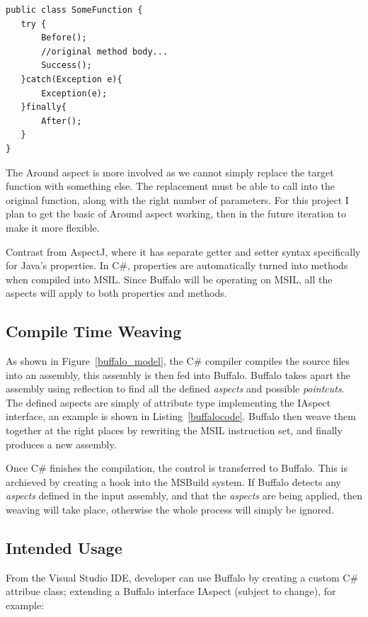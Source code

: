 \begin{lstlisting}[caption={Buffalo aspects}, label=boundaryaspect]
public class SomeFunction {
   try {
       Before();
       //original method body...
       Success();
   }catch(Exception e){
       Exception(e);
   }finally{
       After();
   }
}
\end{lstlisting}

The Around aspect is more involved as we cannot simply replace the target function with something else. The replacement must be able to call into the original function, along with the right number of parameters. For this project I plan to get the basic of Around aspect working, then in the future iteration to make it more flexible.

Contrast from AspectJ, where it has separate getter and setter syntax specifically for Java's properties. In C\#, properties are automatically turned into methods when compiled into MSIL. Since Buffalo will be operating on MSIL, all the aspects will apply to both properties and methods.

\subsection{Compile Time Weaving}
As shown in Figure~\ref{buffalo_model}, the C\# compiler compiles the source files into an assembly, this assembly is then fed into Buffalo. Buffalo takes apart the assembly using reflection to find all the defined {\em aspects} and possible {\em pointcuts}. The defined aspects are simply of attribute type implementing the IAspect interface, an example is shown in Listing~\ref{buffalocode}. Buffalo then weave them together at the right places by rewriting the MSIL instruction set, and finally produces a new assembly.

Once C\# finishes the compilation, the control is transferred to Buffalo. This is archieved by creating a hook into the MSBuild system. If Buffalo detects any {\em aspects} defined in the input assembly, and that the {\em aspects} are being applied, then weaving will take place, otherwise the whole process will simply be ignored.

\subsection{Intended Usage}
From the Visual Studio IDE, developer can use Buffalo by creating a custom C\# attribue class; extending a Buffalo interface IAspect (subject to change), for example:

